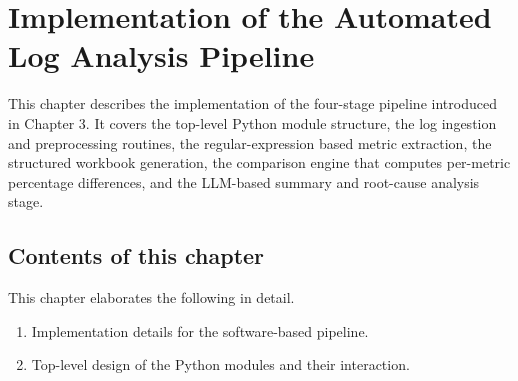 \chapter{Implementation of the Automated Log Analysis Pipeline}

This chapter describes the implementation of the four-stage pipeline introduced in Chapter 3. It covers the top-level Python module structure, the log ingestion and preprocessing routines, the regular-expression based metric extraction, the structured workbook generation, the comparison engine that computes per-metric percentage differences, and the LLM-based summary and root-cause analysis stage.

\section{Contents of this chapter}
This chapter elaborates the following in detail.
\begin{enumerate}
\item Implementation details for the software-based pipeline.
\item Top-level design of the Python modules and their interaction.
\end{enumerate}

